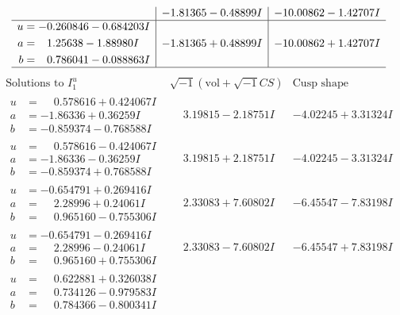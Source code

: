 \documentclass[1p]{elsarticle_modified}
\theoremstyle{definition}
\newcommand{\I}{\sqrt{-1}}
\begin{document}
$$\begin{array}{c|c|c}
 & -1.81365 - 0.48899 I & -10.00862 - 1.42707 I \\ \hline\begin{aligned}
u &= -0.260846 - 0.684203 I \\
a &= \phantom{-}1.25638 - 1.88980 I \\
b &= \phantom{-}0.786041 - 0.088863 I\end{aligned}
 & -1.81365 + 0.48899 I & -10.00862 + 1.42707 I\\
 \hline 
 \end{array}$$\newpage$$\begin{array}{c|c|c}  
\text{Solutions to }I^u_{1}& \I (\text{vol} + \sqrt{-1}CS) & \text{Cusp shape}\\
 \hline 
\begin{aligned}
u &= \phantom{-}0.578616 + 0.424067 I \\
a &= -1.86336 + 0.36259 I \\
b &= -0.859374 - 0.768588 I\end{aligned}
 & \phantom{-}3.19815 - 2.18751 I & -4.02245 + 3.31324 I \\ \hline\begin{aligned}
u &= \phantom{-}0.578616 - 0.424067 I \\
a &= -1.86336 - 0.36259 I \\
b &= -0.859374 + 0.768588 I\end{aligned}
 & \phantom{-}3.19815 + 2.18751 I & -4.02245 - 3.31324 I \\ \hline\begin{aligned}
u &= -0.654791 + 0.269416 I \\
a &= \phantom{-}2.28996 + 0.24061 I \\
b &= \phantom{-}0.965160 - 0.755306 I\end{aligned}
 & \phantom{-}2.33083 + 7.60802 I & -6.45547 - 7.83198 I \\ \hline\begin{aligned}
u &= -0.654791 - 0.269416 I \\
a &= \phantom{-}2.28996 - 0.24061 I \\
b &= \phantom{-}0.965160 + 0.755306 I\end{aligned}
 & \phantom{-}2.33083 - 7.60802 I & -6.45547 + 7.83198 I \\ \hline\begin{aligned}
u &= \phantom{-}0.622881 + 0.326038 I \\
a &= \phantom{-}0.734126 - 0.979583 I \\
b &= \phantom{-}0.784366 - 0.800341 I\end{aligned}

\end{array}$$
\end{document}
